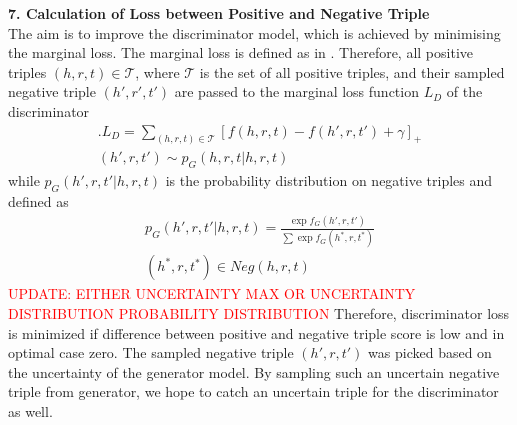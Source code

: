 \textbf{7. Calculation of Loss between Positive and Negative Triple}\\

The aim is to improve the discriminator model, which is achieved by minimising the marginal loss.
The marginal loss is defined as in .
Therefore, all positive triples $(h,r,t) \in \mathcal{T}$, where $\mathcal{T}$ is the set of all positive triples, and their sampled negative triple $(h',r', t')$  are passed to the marginal loss function $L_D$ of the discriminator
\begin{multline} \label{eq:marginalloss2}.
    L_D =\sum_{(h,r,t)\in\mathcal{T}}[f(h,r,t)-f(h',r,t')+\gamma]_+\\
    (h',r,t') \sim p_G(h,r,t|h,r,t) 
\end{multline}
while $p_G(h', r, t'|h, r, t)$ is the probability distribution on negative triples and defined as \cite{cai2017kbgan}
\begin{multline}
    p_G(h',r,t'|h,r,t)=\frac{\exp f_G(h',r,t')}{\sum\exp f_G(h^*,r,t^*)} \\
    (h^*,r,t^*)\in Neg(h,r,t)
\end{multline}
\textcolor{red}{UPDATE: EITHER UNCERTAINTY MAX OR UNCERTAINTY DISTRIBUTION PROBABILITY DISTRIBUTION}
Therefore, discriminator loss is minimized if difference between positive and negative triple score is low and in optimal case zero.
The sampled negative triple $(h',r,t')$ was picked based on the uncertainty of the generator model.
By sampling such an uncertain negative triple from generator, we hope to catch an uncertain triple for the discriminator as well.
